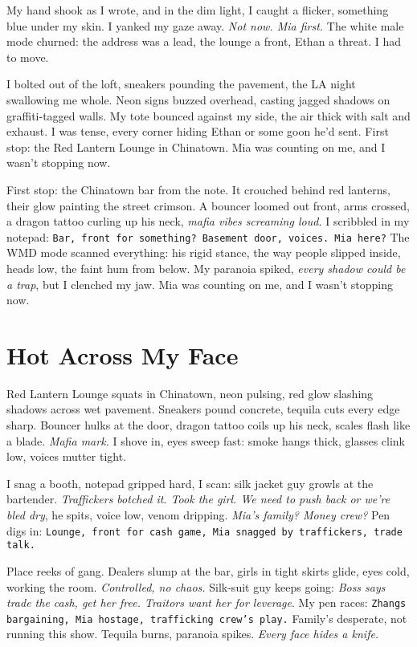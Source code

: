 \documentclass[12pt,oneside]{book}
\newcommand{\note}[1]{\texttt{#1}}
\begin{document}
My hand shook as I wrote, and in the dim light, I caught a flicker, something blue under my skin. I yanked my gaze away. \textit{Not now. Mia first.} The white male mode churned: the address was a lead, the lounge a front, Ethan a threat. I had to move.

I bolted out of the loft, sneakers pounding the pavement, the LA night swallowing me whole. Neon signs buzzed overhead, casting jagged shadows on graffiti-tagged walls. My tote bounced against my side, the air thick with salt and exhaust. I was tense, every corner hiding Ethan or some goon he’d sent. First stop: the Red Lantern Lounge in Chinatown. Mia was counting on me, and I wasn’t stopping now.

First stop: the Chinatown bar from the note. It crouched behind red lanterns, their glow painting the street crimson. A bouncer loomed out front, arms crossed, a dragon tattoo curling up his neck, \textit{mafia vibes screaming loud.} I scribbled in my notepad: \note{Bar, front for something? Basement door, voices. Mia here?} The WMD mode scanned everything: his rigid stance, the way people slipped inside, heads low, the faint hum from below. My paranoia spiked, \textit{every shadow could be a trap}, but I clenched my jaw. Mia was counting on me, and I wasn’t stopping now.

\chapter{Hot Across My Face}

Red Lantern Lounge squats in Chinatown, neon pulsing, red glow slashing shadows across wet pavement. Sneakers pound concrete, tequila cuts every edge sharp. Bouncer hulks at the door, dragon tattoo coils up his neck, scales flash like a blade. \textit{Mafia mark.} I shove in, eyes sweep fast: smoke hangs thick, glasses clink low, voices mutter tight.

I snag a booth, notepad gripped hard, I scan: silk jacket guy growls at the bartender. \textit{Traffickers botched it. Took the girl. We need to push back or we’re bled dry}, he spits, voice low, venom dripping. \textit{Mia’s family? Money crew?} Pen digs in: \note{Lounge, front for cash game, Mia snagged by traffickers, trade talk.}

Place reeks of gang. Dealers slump at the bar, girls in tight skirts glide, eyes cold, working the room. \textit{Controlled, no chaos.} Silk-suit guy keeps going: \textit{Boss says trade the cash, get her free. Traitors want her for leverage}. My pen races: \note{Zhangs bargaining, Mia hostage, trafficking crew’s play.} Family’s desperate, not running this show. Tequila burns, paranoia spikes. \textit{Every face hides a knife.}
\end{document}
